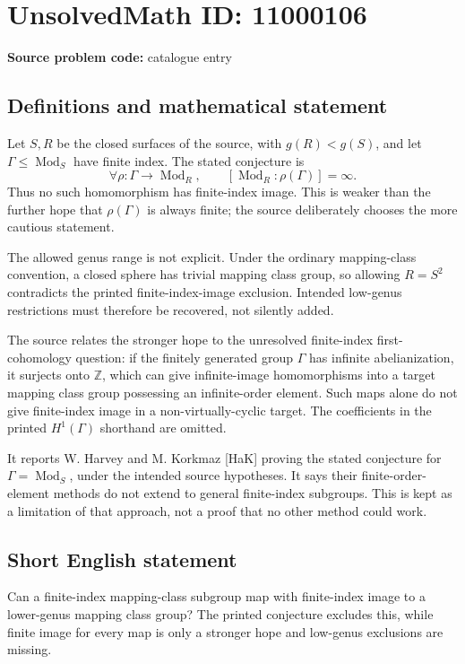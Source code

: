 \documentclass[11pt]{article}
\newcommand{\Z}{\mathbb{Z}}
\begin{document}
\section*{UnsolvedMath ID: 11000106}
\textbf{Source problem code:} catalogue entry
\subsection{Definitions and mathematical statement}
Let \(S,R\) be the closed surfaces of the source, with \(g(R)<g(S)\), and let \(\Gamma\leq\operatorname{Mod}_S\) have finite index. The stated conjecture is
\[
 \forall\rho:\Gamma\longrightarrow\operatorname{Mod}_R,
 \qquad[\operatorname{Mod}_R:\rho(\Gamma)]=\infty.
\]
Thus no such homomorphism has finite-index image. This is weaker than the further hope that \(\rho(\Gamma)\) is always finite; the source deliberately chooses the more cautious statement.

The allowed genus range is not explicit. Under the ordinary mapping-class convention, a closed sphere has trivial mapping class group, so allowing \(R=S^2\) contradicts the printed finite-index-image exclusion. Intended low-genus restrictions must therefore be recovered, not silently added.

The source relates the stronger hope to the unresolved finite-index first-cohomology question: if the finitely generated group \(\Gamma\) has infinite abelianization, it surjects onto \(\Z\), which can give infinite-image homomorphisms into a target mapping class group possessing an infinite-order element. Such maps alone do not give finite-index image in a non-virtually-cyclic target. The coefficients in the printed \(H^1(\Gamma)\) shorthand are omitted.

It reports W. Harvey and M. Korkmaz [HaK] proving the stated conjecture for \(\Gamma=\operatorname{Mod}_S\), under the intended source hypotheses. It says their finite-order-element methods do not extend to general finite-index subgroups. This is kept as a limitation of that approach, not a proof that no other method could work.
\subsection{Short English statement}
Can a finite-index mapping-class subgroup map with finite-index image to a lower-genus mapping class group? The printed conjecture excludes this, while finite image for every map is only a stronger hope and low-genus exclusions are missing.
\end{document}
